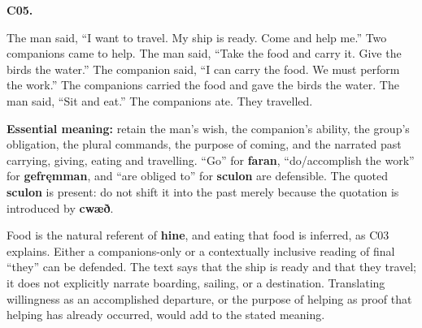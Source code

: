 \par\begin{minipage}{\linewidth}\raggedright
\textbf{C05.}

The man said, “I want to travel. My ship is ready. Come and help me.” Two companions came to help. The man said, “Take the food and carry it. Give the birds the water.” The companion said, “I can carry the food. We must perform the work.” The companions carried the food and gave the birds the water. The man said, “Sit and eat.” The companions ate. They travelled.

\textbf{Essential meaning:} retain the man’s wish, the companion’s ability, the group’s obligation, the plural commands, the purpose of coming, and the narrated past carrying, giving, eating and travelling. “Go” for \textbf{faran}, “do/\allowbreak{}accomplish the work” for \textbf{gefręmman}, and “are obliged to” for \textbf{sculon} are defensible. The quoted \textbf{sculon} is present: do not shift it into the past merely because the quotation is introduced by \textbf{cwæð}.

Food is the natural referent of \textbf{hine}, and eating that food is inferred, as C03 explains. Either a companions-only or a contextually inclusive reading of final “they” can be defended. The text says that the ship is ready and that they travel; it does not explicitly narrate boarding, sailing, or a destination. Translating willingness as an accomplished departure, or the purpose of helping as proof that helping has already occurred, would add to the stated meaning.

\end{minipage}\par\addvspace{4pt}

